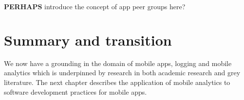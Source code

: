 \textbf{PERHAPS} introduce the concept of app peer groups here?


\section{Summary and transition}
We now have a grounding in the domain of mobile apps, logging and mobile analytics which is underpinned by research in both academic research and grey literature. The next chapter describes the application of mobile analytics to software development practices for mobile apps.
